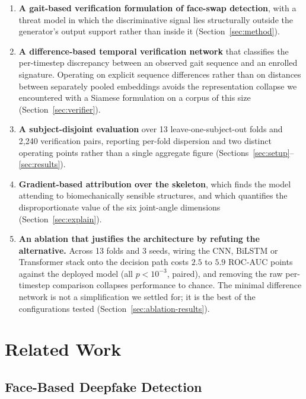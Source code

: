 \documentclass[journal]{IEEEtran}
\begin{document}
\begin{enumerate}
\item \textbf{A gait-based verification formulation of face-swap detection},
      with a threat model in which the discriminative signal lies structurally
      outside the generator's output support rather than inside it
      (Section~\ref{sec:method}).
\item \textbf{A difference-based temporal verification network} that classifies
      the per-timestep discrepancy between an observed gait sequence and an
      enrolled signature. Operating on explicit sequence differences rather
      than on distances between separately pooled embeddings avoids the
      representation collapse we encountered with a Siamese formulation on a
      corpus of this size (Section~\ref{sec:verifier}).
\item \textbf{A subject-disjoint evaluation} over 13 leave-one-subject-out
      folds and 2{,}240 verification pairs, reporting per-fold dispersion and
      two distinct operating points rather than a single aggregate figure
      (Sections~\ref{sec:setup}--\ref{sec:results}).
\item \textbf{Gradient-based attribution over the skeleton}, which finds the
      model attending to biomechanically sensible structures, and which
      quantifies the disproportionate value of the six joint-angle dimensions
      (Section~\ref{sec:explain}).
\item \textbf{An ablation that justifies the architecture by refuting the
      alternative.} Across 13 folds and 3 seeds, wiring the CNN, BiLSTM or
      Transformer stack onto the decision path costs $2.5$ to $5.9$ ROC-AUC
      points against the deployed model (all $p < 10^{-3}$, paired), and
      removing the raw per-timestep comparison collapses performance to
      chance. The minimal difference network is not a simplification we
      settled for; it is the best of the configurations tested
      (Section~\ref{sec:ablation-results}).
\end{enumerate}

\section{Related Work}
\label{sec:related}

\subsection{Face-Based Deepfake Detection}
\end{document}
